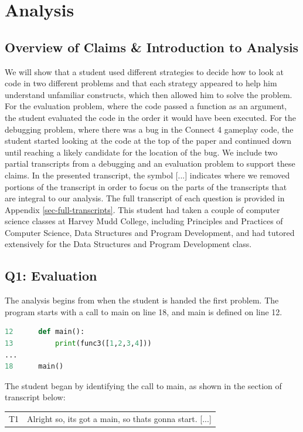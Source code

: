 \section{Analysis}
\subsection{Overview of Claims \& Introduction to Analysis}

We will show that a student used different strategies to decide how to look at code in two different problems and that each strategy appeared to help him understand unfamiliar constructs, which then allowed him to solve the problem.
For the evaluation problem, where the code passed a function as an argument, the student evaluated the code in the order it would have been executed.
For the debugging problem, where there was a bug in the Connect 4 gameplay code, the student started looking at the code at the top of the paper and continued down until reaching a likely candidate for the location of the bug.
We include two partial transcripts from a debugging and an evaluation problem to support these claims. 
In the presented transcript, the symbol [...] indicates where we removed portions of the transcript in order to focus on the parts of the transcripts that are integral to our analysis. 
The full transcript of each question is provided in Appendix \ref{sec-full-transcripts}. 
This student had taken a couple of computer science classes at Harvey Mudd College, including Principles and Practices of Computer Science, Data Structures and Program Development, and had tutored extensively for the Data Structures and Program Development class.

\subsection{Q1: Evaluation}

The analysis begins from when the student is handed the first problem.
The program starts with a call to main on line 18, and main is defined on line 12.

\begin{lstlisting}[language=python]
12		def main():
13			print(func3([1,2,3,4]))
...
18		main()
\end{lstlisting}

The student began by identifying the call to main, as shown in the section of transcript below:

\begin{tabular}{lp{13cm}}
T1&Alright so, its got a main, so thats gonna start. [...]\\
\end{tabular}

